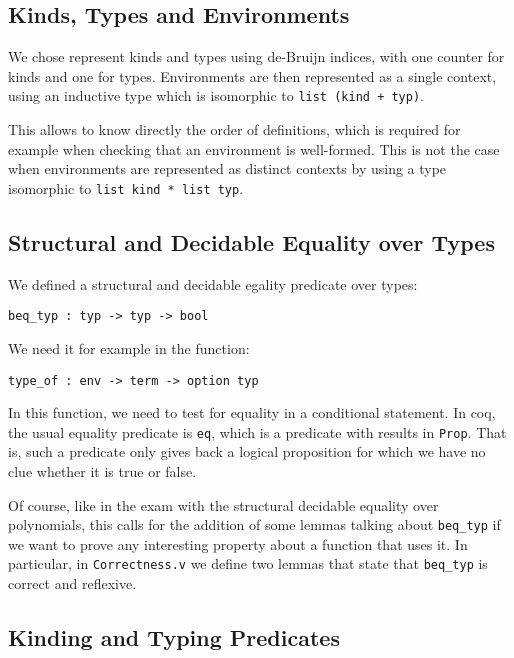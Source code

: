 \documentclass[a4paper,11pt]{article}
\begin{document}
\subsection{Kinds, Types and Environments}

We chose represent kinds and types using de-Bruijn indices, with
one counter for kinds and one for types. Environments are then
represented as a single context, using an inductive type which is
isomorphic to \verb|list (kind + typ)|.

This allows to know directly the order of definitions, which is
required for example when checking that an environment is
well-formed. This is not the case when environments are represented as
distinct contexts by using a type isomorphic to
\verb|list kind * list typ|.

\subsection{Structural and Decidable Equality over Types}

We defined a structural and decidable egality predicate over types:

\begin{verbatim}
beq_typ : typ -> typ -> bool
\end{verbatim}

We need it for example in the function:

\begin{verbatim}
type_of : env -> term -> option typ
\end{verbatim}

In this function, we need to test for equality in a conditional
statement. In coq, the usual equality predicate is \verb|eq|, which is
a predicate with results in \verb|Prop|. That is, such a predicate
only gives back a logical proposition for which we have no clue
whether it is true or false.

Of course, like in the exam with the structural decidable equality over
polynomials, this calls for the addition of some lemmas talking about
\verb|beq_typ| if we want to prove any interesting property about a
function that uses it. In particular, in \verb|Correctness.v| we
define two lemmas that state that \verb|beq_typ| is correct and
reflexive.

\subsection{Kinding and Typing Predicates}
\end{document}
